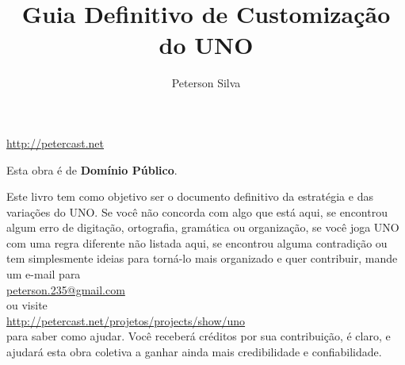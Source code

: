 \documentclass[a5paper,10pt]{book}
\title{Guia Definitivo de Customização do UNO}
\author{Peterson Silva}
\date{}
\begin{document}
\maketitle

\begin{center}
\url{http://petercast.net}
\end{center}

\vfill

\begin{center}
Esta obra é de \textbf{Domínio Público}.
\end{center}

\begin{figure}[!b]
\centering
{}
\end{figure}




\tableofcontents













\newpage

\vspace{5cm}

\begin{center}
\begin{small}
Este livro tem como objetivo ser o documento definitivo da estratégia e das variações do UNO. Se você não concorda com algo que está aqui, se encontrou algum erro de digitação, ortografia, gramática ou organização, se você joga UNO com uma regra diferente não listada aqui, se encontrou alguma contradição ou tem simplesmente ideias para torná-lo mais organizado e quer contribuir, mande um e-mail para \\

\href{mailto:peterson.235@gmail.com}{peterson.235@gmail.com} \\

ou visite \\

\url{http://petercast.net/projetos/projects/show/uno} \\

para saber como ajudar. Você receberá créditos por sua contribuição, é claro, e ajudará esta obra coletiva a ganhar ainda mais credibilidade e confiabilidade.
\end{small}
\end{center}
\end{document}
